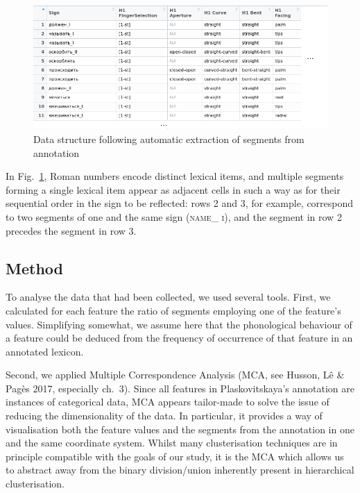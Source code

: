\begin{figure}
\hypertarget{fig:table}{%
\centering
\includegraphics{data-example.png}
\caption{Data structure following automatic extraction of segments from
annotation}\label{fig:table}
}
\end{figure}

In Fig.~\ref{fig:table}, Roman numbers encode distinct lexical items,
and multiple segments forming a single lexical item appear as adjacent
cells in such a way as for their sequential order in the sign to be
reflected: rows 2 and 3, for example, correspond to two segments of one
and the same sign (\textsc{name\_ i}), and the segment in row 2 precedes
the segment in row 3.

\hypertarget{method}{%
\subsection{Method}\label{method}}

To analyse the data that had been collected, we used several tools.
First, we calculated for each feature the ratio of segments employing
one of the feature's values. Simplifying somewhat, we assume here that
the phonological behaviour of a feature could be deduced from the
frequency of occurrence of that feature in an annotated lexicon.

Second, we applied Multiple Correspondence Analysis (MCA, see Husson, Lê
\& Pagès 2017, especially ch.~3). Since all features in Plaskovitskaya's
annotation are instances of categorical data, MCA appears tailor-made to
solve the issue of reducing the dimensionality of the data. In
particular, it provides a way of visualisation both the feature values
and the segments from the annotation in one and the same coordinate
system. Whilst many clusterisation techniques are in principle
compatible with the goals of our study, it is the MCA which allows us to
abstract away from the binary division/union inherently present in
hierarchical clusterisation.

